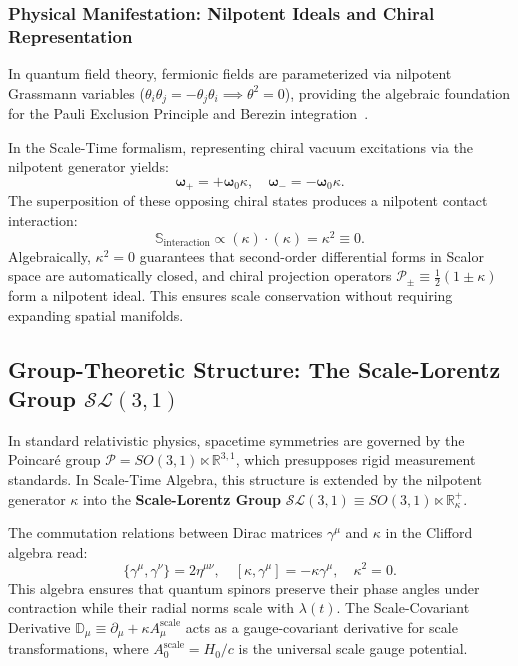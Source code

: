 \documentclass[11pt,a4paper]{article}
\begin{document}
\subsubsection{Physical Manifestation: Nilpotent Ideals and Chiral Representation}
In quantum field theory, fermionic fields are parameterized via nilpotent Grassmann variables ($\theta_i \theta_j = -\theta_j \theta_i \implies \theta^2 = 0$), providing the algebraic foundation for the Pauli Exclusion Principle and Berezin integration~\cite{berezin1966}.

In the Scale-Time formalism, representing chiral vacuum excitations via the nilpotent generator yields:
\begin{equation}
    \boldsymbol{\omega}_+ = +\boldsymbol{\omega}_0 \kappa, \quad \boldsymbol{\omega}_- = -\boldsymbol{\omega}_0 \kappa.
\end{equation}
The superposition of these opposing chiral states produces a nilpotent contact interaction:
\begin{equation}
    \mathbb{S}_{\mathrm{interaction}} \propto (\kappa) \cdot (\kappa) = \kappa^2 \equiv 0.
\end{equation}
Algebraically, $\kappa^2 = 0$ guarantees that second-order differential forms in Scalor space are automatically closed, and chiral projection operators $\mathcal{P}_\pm \equiv \frac{1}{2}(1 \pm \kappa)$ form a nilpotent ideal. This ensures scale conservation without requiring expanding spatial manifolds.

\subsection{Group-Theoretic Structure: The Scale-Lorentz Group $\mathcal{SL}(3,1)$}
In standard relativistic physics, spacetime symmetries are governed by the Poincaré group $\mathcal{P} = SO(3,1) \ltimes \mathbb{R}^{3,1}$, which presupposes rigid measurement standards. In Scale-Time Algebra, this structure is extended by the nilpotent generator $\kappa$ into the \textbf{Scale-Lorentz Group} $\mathcal{SL}(3,1) \equiv SO(3,1) \ltimes \mathbb{R}^+_\kappa$.

The commutation relations between Dirac matrices $\gamma^\mu$ and $\kappa$ in the Clifford algebra read:
\begin{equation}
    \{\gamma^\mu, \gamma^\nu\} = 2\eta^{\mu\nu}, \quad [\kappa, \gamma^\mu] = -\kappa \gamma^\mu, \quad \kappa^2 = 0.
    \label{eq:clifford_scale}
\end{equation}
This algebra ensures that quantum spinors preserve their phase angles under contraction while their radial norms scale with $\lambda(t)$. The Scale-Covariant Derivative $\mathbb{D}_\mu \equiv \partial_\mu + \kappa A_\mu^{\mathrm{scale}}$ acts as a gauge-covariant derivative for scale transformations, where $A_0^{\mathrm{scale}} = H_0/c$ is the universal scale gauge potential.
\end{document}
